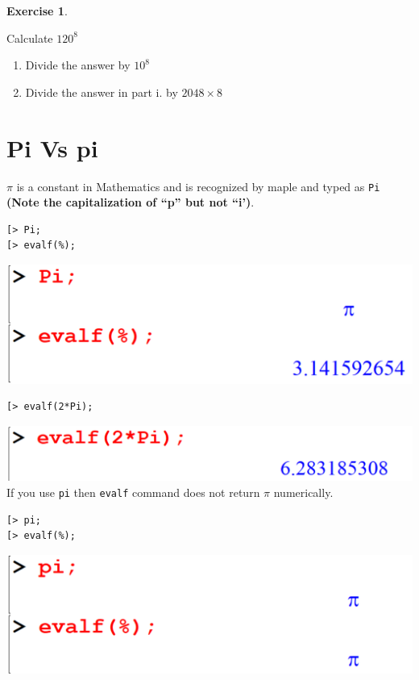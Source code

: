 \documentclass[
]{book}
\providecommand{\tightlist}{%
  \setlength{\itemsep}{0pt}\setlength{\parskip}{0pt}}
\theoremstyle{definition}
\theoremstyle{definition}
\theoremstyle{definition}
\newtheorem{exercise}{Exercise}[chapter]
\theoremstyle{definition}
\theoremstyle{remark}
\begin{document}
\begin{exercise}
\protect\hypertarget{exr:unnamed-chunk-5}{}\label{exr:unnamed-chunk-5}

Calculate \(120^8\)

\begin{enumerate}
\def\labelenumi{\roman{enumi}.}
\tightlist
\item
  Divide the answer by \(10^8\)
\item
  Divide the answer in part i. by \(2048 \times 8\)
\end{enumerate}

\end{exercise}

\section{Pi Vs pi}\label{pi-vs-pi}

\(\pi\) is a constant in Mathematics and is recognized by maple and typed as \texttt{Pi} \textbf{(Note the capitalization of ``p'' but not ``i')}.

\begin{verbatim}
[> Pi;
[> evalf(%);
\end{verbatim}

\includegraphics{figures/Lesson 1/fig31.png}

\begin{verbatim}
[> evalf(2*Pi);
\end{verbatim}

\includegraphics{figures/Lesson 1/fig32.png}
If you use \texttt{pi} then \texttt{evalf} command does not return \(\pi\) numerically.

\begin{verbatim}
[> pi;
[> evalf(%);
\end{verbatim}

\includegraphics{figures/Lesson 1/fig33.png}
\end{document}
